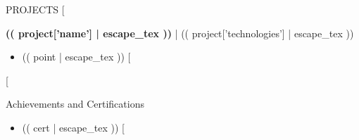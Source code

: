 \documentclass{resume_style} %
\begin{document}
\vspace{-0.7em}
\begin{rSection}{PROJECTS}
\vspace{-1em}
[%
    \vspace{-0.2em}
    \item \textbf{(( project['name'] | escape_tex ))} {| (( project['technologies'] | escape_tex ))}
    \vspace{-0.4em}
    \begin{itemize}
        \setlength{\itemsep}{2pt}
        \setlength{\parskip}{0pt}
        \setlength{\parsep}{1pt}
        [%
            \item (( point | escape_tex ))
        [%
    \end{itemize}
[%
\end{rSection} 

\vspace{-0.7em}
\begin{rSection}{Achievements and Certifications} 
\begin{itemize}
    \setlength{\itemsep}{2pt}
    \setlength{\parskip}{0pt}
    \setlength{\parsep}{1pt}
    [%
        \item (( cert | escape_tex ))
    [%
\end{itemize}
\end{rSection}
\end{document}
